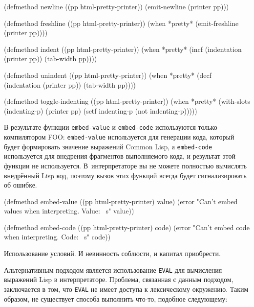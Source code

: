 \begin{myverb}
(defmethod newline ((pp html-pretty-printer))
  (emit-newline (printer pp)))

(defmethod freshline ((pp html-pretty-printer))
  (when *pretty* (emit-freshline (printer pp))))

(defmethod indent ((pp html-pretty-printer))
  (when *pretty* 
    (incf (indentation (printer pp)) (tab-width pp))))

(defmethod unindent ((pp html-pretty-printer))
  (when *pretty* 
    (decf (indentation (printer pp)) (tab-width pp))))

(defmethod toggle-indenting ((pp html-pretty-printer))
  (when *pretty* 
    (with-slots (indenting-p) (printer pp)
      (setf indenting-p (not indenting-p)))))
\end{myverb}

В результате функции \lstinline{embed-value} и \lstinline{embed-code} используются только
компилятором FOO: \lstinline{embed-value} используется для генерации кода, который будет
формировать значение выражений Common Lisp, а \lstinline{embed-code} используется для
внедрения фрагментов выполняемого кода, и результат этой функции не используется.
В~интерпретаторе вы не можете полностью вычислять внедрённый Lisp код, поэтому вызов этих
функций всегда будет сигнализировать об ошибке.

\begin{myverb}
(defmethod embed-value ((pp html-pretty-printer) value)
  (error "Can't embed values when  interpreting. Value: ~s" value))

(defmethod embed-code ((pp html-pretty-printer) code)
  (error "Can't embed code when interpreting. Code: ~s" code))
\end{myverb}


Использование условий. И невинность соблюсти, и капитал приобрести.

Альтернативным подходом является использование \lstinline{EVAL} для вычисления выражений
Lisp в интерпретаторе. Проблема, связанная с данным подходом, заключается в том, что
\lstinline{EVAL} не имеет доступа к лексическому окружению. Таким образом, не существует
способа выполнить что-то, подобное следующему:

